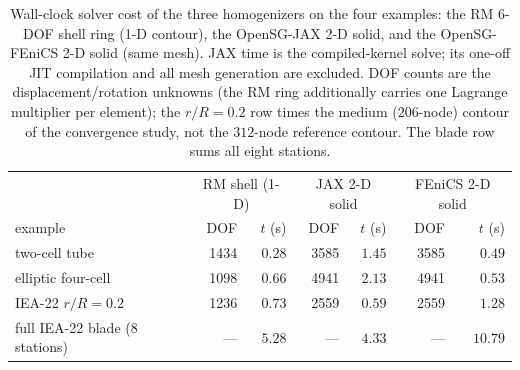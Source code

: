 \begin{table}[t]\centering\small
\caption{Wall-clock solver cost of the three homogenizers on the four examples: the RM 6-DOF shell ring (1-D contour), the OpenSG-JAX 2-D solid, and the OpenSG-FEniCS 2-D solid (same mesh). JAX time is the compiled-kernel solve; its one-off JIT compilation and all mesh generation are excluded. DOF counts are the displacement/rotation unknowns (the RM ring additionally carries one Lagrange multiplier per element); the $r/R=0.2$ row times the medium ($206$-node) contour of the convergence study, not the $312$-node reference contour. The blade row sums all eight stations.}\label{tab:timing4}
\setlength{\tabcolsep}{5pt}
\begin{tabular}{l|rr|rr|rr}
\toprule
& \multicolumn{2}{c|}{RM shell (1-D)} & \multicolumn{2}{c|}{JAX 2-D solid} & \multicolumn{2}{c}{FEniCS 2-D solid}\\
example & DOF & $t$ (s) & DOF & $t$ (s) & DOF & $t$ (s)\\
\midrule
two-cell tube & 1434 & $0.28$ & 3585 & $1.45$ & 3585 & $0.49$\\
elliptic four-cell & 1098 & $0.66$ & 4941 & $2.13$ & 4941 & $0.53$\\
IEA-22 $r/R=0.2$ & 1236 & $0.73$ & 2559 & $0.59$ & 2559 & $1.28$\\
full IEA-22 blade (8 stations) & --- & $5.28$ & --- & $4.33$ & --- & $10.79$\\
\bottomrule
\end{tabular}
\end{table}